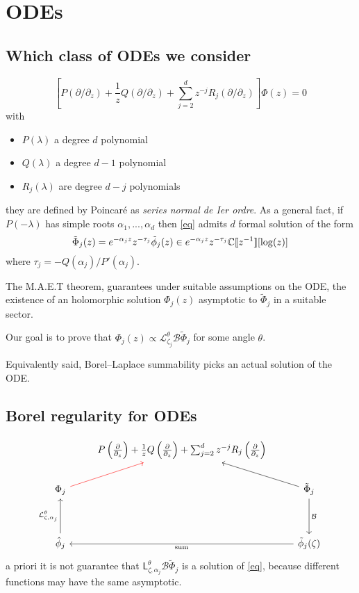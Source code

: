 \documentclass[11pt,a4paper,twoside,leqno,noamsfonts]{amsart}
\numberwithin{equation}{section}
\begin{document}
\section{ODEs}
\subsection{Which class of ODEs we consider}
\begin{equation}\label{eq}
[P(\partial/\partial_z)+\frac{1}{z}Q(\partial/\partial_z)+\sum_{j=2}^dz^{-j}R_j(\partial/\partial_z)]\Phi(z)=0
\end{equation}
with
\begin{itemize}
\item $P(\lambda)$ a degree $d$ polynomial
\item $Q(\lambda)$ a degree $d-1$ polynomial 
\item $R_j(\lambda)$ are degree $d-j$ polynomials 
\end{itemize}
they are defined by Poincar\'e as \textit{series normal de Ier ordre}. As a general fact, if $P(-\lambda)$ has simple roots $\alpha_1,...,\alpha_d$ then \eqref{eq} admits $d$ formal solution of the form
\begin{equation}
\tilde{\Phi}_j(z)=e^{-\alpha_jz}z^{-\tau_j}\tilde{\phi}_j(z)\in e^{-\alpha_jz}z^{-\tau_j}\mathbb C[\![z^{-1}]\!][\log(z)]
\end{equation}  
where $\tau_j=-Q(\alpha_j)/P'(\alpha_j)$. 

The M.A.E.T theorem, guarantees under suitable assumptions on the ODE, the existence of an holomorphic solution $\Phi_j(z)$ asymptotic to $\tilde{\Phi}_j$ in a suitable sector. 

Our goal is to prove that $\Phi_j(z)\propto\mathcal{L}_{\zeta_j}^{\theta}\mathcal{B}\tilde{\Phi}_j$ for some angle $\theta$.

Equivalently said, Borel--Laplace summability picks an actual solution of the ODE.

\subsection{Borel regularity for ODEs}

\[
\begin{tikzcd}
& P\left(\frac{\partial}{\partial_z}\right)+\frac{1}{z}Q\left(\frac{\partial}{\partial_z}\right)+\sum_{j=2}^dz^{-j}R_j\left(\frac{\partial}{\partial_z}\right) & \\
\Phi_j\arrow[ru,red] & & \tilde{\Phi}_j\arrow[lu]\arrow[dd, "\mathcal{B}"] \\
& & \\
\hat{\phi}_j\arrow[uu,  "\mathcal{L}_{\zeta,\alpha_j}^\theta"]& & \tilde{\phi}_j(\zeta)\arrow[ll,"\text{sum}"] 
\end{tikzcd}
\]
a priori it is not guarantee that $\mathsf{L}_{\zeta,\alpha_j}^\theta\mathcal{B}\tilde{\Phi}_j$ is a solution of \eqref{eq}, because different functions may have the same asymptotic. 
\end{document}
